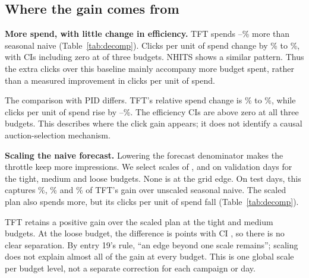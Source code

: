 \documentclass[sigconf,nonacm]{acmart}
\begin{document}
\subsection{Where the gain comes from}\label{sec:where}
\begin{table}[tb]
  \caption{Median-plan comparisons. Click gains are reference-click points with 95\% campaign-bootstrap CIs; spend and efficiency columns are relative percentage changes.}
  \label{tab:decomp}
  \small\setlength{\tabcolsep}{3pt}
  \resizebox{\linewidth}{!}{}
\end{table}

\textbf{More spend, with little change in efficiency.} TFT spends
--\% more than
seasonal naive (Table~\ref{tab:decomp}). Clicks per unit of spend change by
\% to \%, with CIs
including zero at  of three budgets. NHITS shows
a similar pattern. Thus the extra clicks over this baseline mainly accompany
more budget spent, rather than a measured improvement in clicks per unit of
spend.

The comparison with PID differs. TFT's relative spend change is
\% to \%, while clicks
per unit of spend rise by --\%.
The efficiency CIs are above zero at all three budgets. This describes where
the click gain appears; it does not identify a causal auction-selection
mechanism.

\textbf{Scaling the naive forecast.} Lowering the forecast denominator makes
the throttle keep more impressions. We select scales of
,  and  on
validation days for the tight, medium and loose budgets. None is at the grid
edge. On test days, this captures \%,
\% and \% of TFT's gain over
unscaled seasonal naive. The scaled plan also spends more, but its clicks per
unit of spend fall (Table~\ref{tab:decomp}).

TFT retains a positive gain over the scaled plan at the tight and medium
budgets. At the loose budget, the difference is  points
with CI , so there is no clear separation. By entry 19's
rule, ``an edge beyond one scale remains''; scaling does not explain almost
all of the gain at every budget. This is one global scale per budget level,
not a separate correction for each campaign or day.
\end{document}
